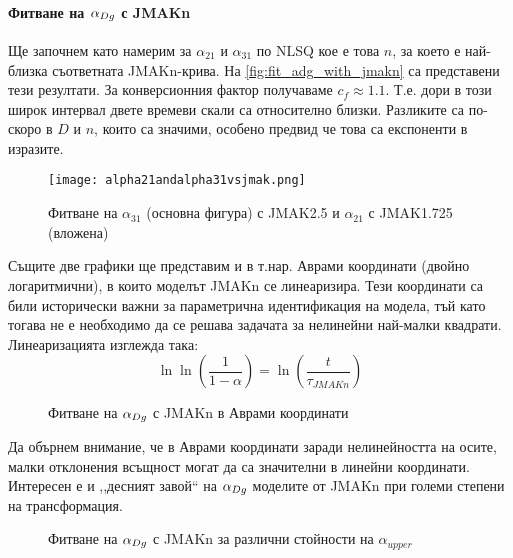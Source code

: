 \paragraph{Фитване на $\alpha_{Dg}$ с JMAKn}
Ще започнем като намерим за $\alpha_{21}$ и $\alpha_{31}$ по NLSQ кое е това $n$, за което е най-близка съответната JMAKn-крива. На \autoref{fig:fit_adg_with_jmakn} са представени тези резултати. За конверсионния фактор получаваме $c_{f} \approx 1.1$. Т.е. дори в този широк интервал двете времеви скали са относително близки. Разликите са по-скоро в $D$ и $n$, които са значими, особено предвид че това са експоненти в изразите.
\begin{figure}[hbpt]
    \centering
    \texttt{[image: alpha21andalpha31vsjmak.png]}
    \caption{Фитване на $\alpha_{31}$ (основна фигура) с JMAK2.5 и $\alpha_{21}$ с JMAK1.725 (вложена)}
    \label{fig:fit_adg_with_jmakn}
\end{figure}
Същите две графики ще представим и в т.нар. Аврами координати (двойно логаритмични), в които моделът JMAKn се линеаризира. Тези координати са били исторически важни за параметрична идентификация на модела, тъй като тогава не е необходимо да се решава задачата за нелинейни най-малки квадрати. \cite{Fanfoni1998} Линеаризацията изглежда така: 
\begin{equation*}
    \ln{\ln{\left(\frac{1}{1-\alpha}\right)}} = \ln{\left(\frac{t}{\tau_{JMAKn}}\right)}
\end{equation*}
\begin{figure}[!ht]
    \centering
        \caption{Фитване на $\alpha_{Dg}$ с JMAKn в Аврами координати}
    \label{fig:avrami_coords_adg_jmak}
\end{figure}
Да обърнем внимание, че в Аврами координати заради нелинейността на осите, малки отклонения всъщност могат да са значителни в линейни координати. Интересен е и ,,десният завой`` на $\alpha_{Dg}$ моделите от JMAKn при големи степени на трансформация.
\begin{figure}[!ht]
    \centering
        \caption{Фитване на $\alpha_{Dg}$ с JMAKn за различни стойности на $\alpha_{upper}$}
    \label{fig:avrami_coords_adg_jmak_moving_alpha_max}
\end{figure}

